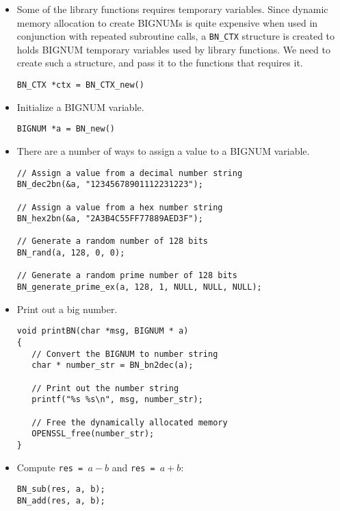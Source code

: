 \begin{itemize}

\item Some of the library functions requires temporary variables.
Since dynamic memory allocation to create BIGNUMs is quite expensive
when used in conjunction with repeated subroutine calls, 
a \texttt{BN\_CTX} structure is created to holds BIGNUM temporary variables 
used by library functions. We need to create such a structure, and pass
it to the functions that requires it.

\begin{lstlisting}
BN_CTX *ctx = BN_CTX_new()
\end{lstlisting}


\item Initialize a BIGNUM variable.

\begin{lstlisting}
BIGNUM *a = BN_new()
\end{lstlisting}


\item There are a number of ways to assign a value to a BIGNUM variable.


\begin{lstlisting}
// Assign a value from a decimal number string
BN_dec2bn(&a, "12345678901112231223");

// Assign a value from a hex number string
BN_hex2bn(&a, "2A3B4C55FF77889AED3F");

// Generate a random number of 128 bits
BN_rand(a, 128, 0, 0);

// Generate a random prime number of 128 bits
BN_generate_prime_ex(a, 128, 1, NULL, NULL, NULL);
\end{lstlisting}


\item Print out a big number. 

\begin{lstlisting}
void printBN(char *msg, BIGNUM * a)
{
   // Convert the BIGNUM to number string
   char * number_str = BN_bn2dec(a);

   // Print out the number string
   printf("%s %s\n", msg, number_str);

   // Free the dynamically allocated memory
   OPENSSL_free(number_str);
}
\end{lstlisting}


\item Compute \texttt{res = $a - b$} and \texttt{res = $a + b$}: 

\begin{lstlisting}
BN_sub(res, a, b);
BN_add(res, a, b);
\end{lstlisting}
 



\end{itemize}
